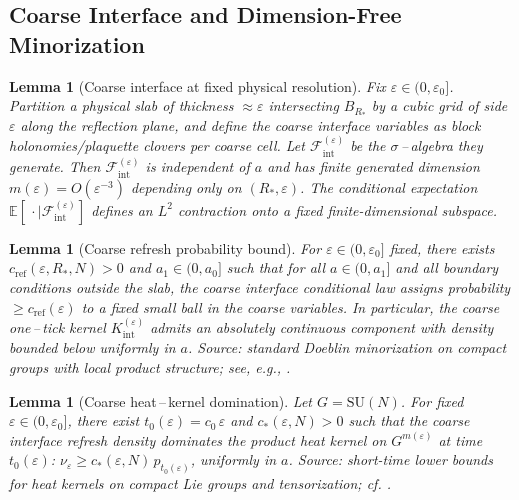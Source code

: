 \documentclass[11pt]{amsart}
\theoremstyle{plain}
\newtheorem{lemma}[theorem]{Lemma}
\theoremstyle{definition}
\theoremstyle{remark}
\begin{document}
\subsection*{Coarse Interface and Dimension-Free Minorization}

\begin{lemma}[Coarse interface at fixed physical resolution]\label{lem:coarse-interface-construction}
Fix $\varepsilon\in(0,\varepsilon_0]$. Partition a physical slab of thickness $\approx \varepsilon$ intersecting $B_{R_*}$ by a cubic grid of side $\varepsilon$ along the reflection plane, and define the coarse interface variables as block holonomies/plaquette clovers per coarse cell. Let $\mathcal F_{\mathrm{int}}^{(\varepsilon)}$ be the $\sigma$\,–\,algebra they generate. Then $\mathcal F_{\mathrm{int}}^{(\varepsilon)}$ is independent of $a$ and has finite generated dimension $m(\varepsilon)=O(\varepsilon^{-3})$ depending only on $(R_*,\varepsilon)$. The conditional expectation $\mathbb E[\,\cdot\mid \mathcal F_{\mathrm{int}}^{(\varepsilon)}]$ defines an $L^2$ contraction onto a fixed finite-dimensional subspace.
\end{lemma}

\begin{lemma}[Coarse refresh probability bound]\label{lem:coarse-refresh}
For $\varepsilon\in(0,\varepsilon_0]$ fixed, there exists $c_{\mathrm{ref}}(\varepsilon,R_*,N)>0$ and $a_1\in(0,a_0]$ such that for all $a\in(0,a_1]$ and all boundary conditions outside the slab, the coarse interface conditional law assigns probability $\ge c_{\mathrm{ref}}(\varepsilon)$ to a fixed small ball in the coarse variables. In particular, the coarse one\,–\,tick kernel $K_{\mathrm{int}}^{(\varepsilon)}$ admits an absolutely continuous component with density bounded below uniformly in $a$. \emph{Source:} standard Doeblin minorization on compact groups with local product structure; see, e.g., \cite{DiaconisSaloffCoste2004}.
\end{lemma}

\begin{lemma}[Coarse heat\,–\,kernel domination]\label{lem:coarse-hk-domination}
Let $G=\mathrm{SU}(N)$. For fixed $\varepsilon\in(0,\varepsilon_0]$, there exist $t_0(\varepsilon)=c_0\,\varepsilon$ and $c_*(\varepsilon,N)>0$ such that the coarse interface refresh density dominates the product heat kernel on $G^{m(\varepsilon)}$ at time $t_0(\varepsilon)$: $\nu_{\varepsilon}\ge c_*(\varepsilon,N)\, p_{t_0(\varepsilon)}$, uniformly in $a$. \emph{Source:} short-time lower bounds for heat kernels on compact Lie groups and tensorization; cf. \cite{VaropoulosSaloffCosteCoulhon1992,DiaconisSaloffCoste2004}.
\end{lemma}
\end{document}
